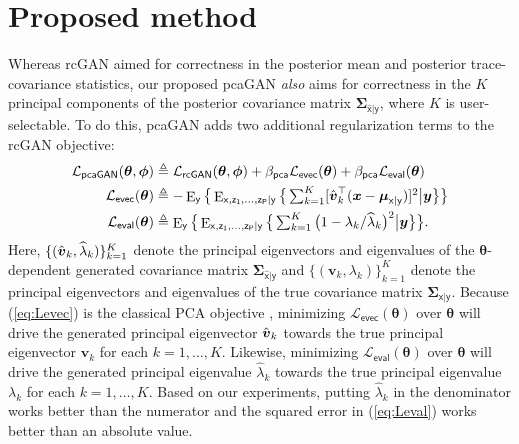 \documentclass{article}
\theoremstyle{plain}
\theoremstyle{definition}
\theoremstyle{remark}
\renewcommand{\hat}{\widehat}
\newcommand{\defn}{\triangleq}
\newcommand{\hvec}[1]{\ensuremath{\Hat{\boldsymbol{#1}}}}
\renewcommand{\vec}[1]{\ensuremath{\boldsymbol{#1}}}
\newcommand{\mc}[1]{\ensuremath{\mathcal{#1}}}
\newcommand{\tran}{^{\top}}
\DeclareMathOperator{\E}{E}
\renewcommand{\eqref}[1]{(\ref{eq:#1})}
\newcommand{\eval}{_{\mathsf{eval}}}
\newcommand{\evec}{_{\mathsf{evec}}}
\newcommand{\Lrcgan}{\mc{L}_{\mathsf{rcGAN}}}
\newcommand{\Lpcagan}{\mc{L}_{\mathsf{pcaGAN}}}
\newcommand{\Levec}{\mc{L}\evec}
\newcommand{\Leval}{\mc{L}\eval}
\newcommand{\betapca}{\beta_{\mathsf{pca}}}
\newcommand{\Ey}{\E_{\mathsf{y}}}
\newcommand{\ExzPgy}{\E_{\mathsf{x,z_1,...,z_P}|\mathsf{y}}}
\newcommand{\muxgy}{\vec{\mu}_{\mathsf{x}|\mathsf{y}}}
\newcommand{\Sigxgy}{\vec{\Sigma}_{\mathsf{x}|\mathsf{y}}}
\newcommand{\Sigxgyhat}{\vec{\Sigma}_{\hat{\mathsf{x}}|\mathsf{y}}}
\begin{document}
\section{Proposed method} \label{sec:proposed}

Whereas rcGAN aimed for correctness in the posterior mean and posterior trace-covariance statistics, our proposed pcaGAN \emph{also} aims for correctness in the $K$ principal components of the posterior covariance matrix $\Sigxgyhat$, where $K$ is user-selectable.
To do this, pcaGAN adds two additional regularization terms to the rcGAN objective:
\begin{align}
\Lpcagan(\vec{\theta},\vec{\phi})
&\defn \Lrcgan(\vec{\theta},\vec{\phi}) + \betapca\Levec(\vec{\theta}) + \betapca\Leval(\vec{\theta})
\label{eq:eigganobj}\\
\Levec(\vec{\theta})
&\defn \textstyle -\Ey\big\{ \ExzPgy\big\{ \sum_{k=1}^K[\hvec{v}_k\tran(\vec{x}-\muxgy)]^2 \big|\vec{y}\big\}\big\}
\label{eq:Levec}\\
\Leval(\vec{\theta})
&\defn \textstyle \Ey\big\{ \ExzPgy\big\{ \sum_{k=1}^K \big(1-\lambda_k/\hat{\lambda}_k\big)^2 \big|\vec{y}\big\}\big\}
\label{eq:Leval}.
\end{align}
Here, $\{(\hvec{v}_k,\hat{\lambda}_k)\}_{k=1}^K$ denote the principal eigenvectors and eigenvalues of the $\vec{\theta}$-dependent generated covariance matrix $\Sigxgyhat$ and $\{(\vec{v}_k,\lambda_k)\}_{k=1}^K$ denote the principal eigenvectors and eigenvalues of the true covariance matrix $\Sigxgy$.
Because \eqref{Levec} is the classical PCA objective \cite{Jolliffe:Book:02}, minimizing $\Levec(\vec{\theta})$ over $\vec{\theta}$ will drive the generated principal eigenvector $\hvec{v}_k$ towards the true principal eigenvector $\vec{v}_k$ for each $k=1,\dots,K$.
Likewise, 
minimizing $\Leval(\vec{\theta})$ over $\vec{\theta}$ will drive the generated principal eigenvalue $\hat{\lambda}_k$ towards the true principal eigenvalue $\lambda_k$ for each $k=1,\dots,K$.
Based on our experiments, putting $\hat{\lambda}_k$ in the denominator works better than the numerator and the squared error in \eqref{Leval} works better than an absolute value.
\end{document}
